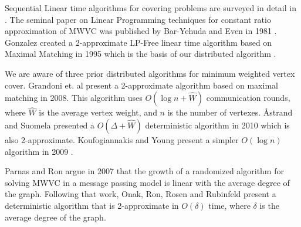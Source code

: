 Sequential Linear time algorithms for covering problems are surveyed in detail in \cite{254190}. The seminal paper on Linear Programming techniques for constant ratio approximation of MWVC was published by Bar-Yehuda and Even in 1981 \cite{Bar-Yehuda:1981lr}. Gonzalez created a 2-approximate LP-Free linear time algorithm based on Maximal Matching in 1995 which is the basis of our distributed algorithm \cite{Gonzalez1995129}. 

We are aware of three prior distributed algorithms for minimum weighted vertex cover. Grandoni et. al present a 2-approximate algorithm based on maximal matching in 2008\cite{1435381}. This algorithm uses $O(\log n + \hat{W})$ communication rounds, where $\hat{W}$ is the average vertex weight, and $n$ is the number of vertexes. {\AA}strand and Suomela presented a $O(\Delta + \hat{W})$ deterministic algorithm in 2010 which is also 2-approximate. Koufogiannakis and Young present a simpler $O(\log n)$ algorithm in 2009 \cite{1582746}. 

Parnas and Ron argue in 2007 that the growth of a randomized algorithm for solving MWVC in a message passing model is linear with the average degree of the graph\cite{Parnas:2007:AMV:1280283.1280327}. Following that work, Onak, Ron, Rosen and Rubinfeld present a deterministic algorithm that is 2-approximate in $O(\delta)$ time, where $\delta$ is the average degree of the graph\cite{Onak:2012:NSA:2095116.2095204}. 
